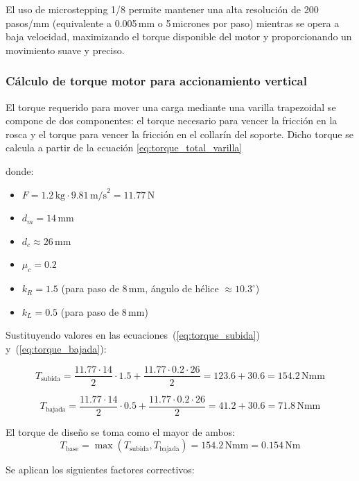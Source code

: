 El uso de microstepping 1/8 permite mantener una alta resolución de 200\,pasos/mm (equivalente a 0.005\,mm o 5\,micrones por paso) mientras se opera a baja velocidad, maximizando el torque disponible del motor y proporcionando un movimiento suave y preciso.
\subsubsection{Cálculo de torque motor para accionamiento vertical}

El torque requerido para mover una carga mediante una varilla trapezoidal se compone de dos componentes: el torque necesario para vencer la fricción en la rosca y el torque para vencer la fricción en el collarín del soporte. Dicho torque se calcula a partir de la ecuación \ref{eq:torque_total_varilla}

donde:
\begin{itemize}[label=$\bullet$]
    \item $F = 1.2\,\text{kg} \cdot 9.81\,\text{m/s}^2 = 11.77$\,N
    \item $d_m = 14$\,mm
    \item $d_c \approx 26$\,mm
    \item $\mu_c = 0.2$
    \item $k_R = 1.5$ (para paso de 8\,mm, ángulo de hélice $\approx 10.3^\circ$)
    \item $k_L = 0.5$ (para paso de 8\,mm)
\end{itemize}

Sustituyendo valores en las ecuaciones~(\ref{eq:torque_subida}) y~(\ref{eq:torque_bajada}):

\[T_{\text{subida}} = \frac{11.77 \cdot 14}{2} \cdot 1.5 + \frac{11.77 \cdot 0.2 \cdot 26}{2} = 123.6 + 30.6 = 154.2\,\text{Nmm}\]

\[T_{\text{bajada}} = \frac{11.77 \cdot 14}{2} \cdot 0.5 + \frac{11.77 \cdot 0.2 \cdot 26}{2} = 41.2 + 30.6 = 71.8\,\text{Nmm}\]

El torque de diseño se toma como el mayor de ambos:
\[T_{\text{base}} = \max(T_{\text{subida}}, T_{\text{bajada}}) = 154.2\,\text{Nmm} = 0.154\,\text{Nm}\]

Se aplican los siguientes factores correctivos:


